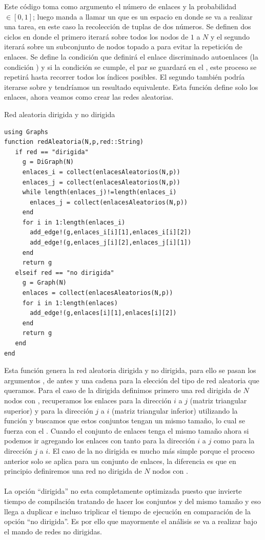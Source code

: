 Este código toma como argumento el número de enlaces  y la probabilidad $\in[0,1]$; luego manda a llamar un  que es un espacio en donde se va a realizar una tarea, en este caso la recolección de tuplas de dos números. Se definen dos ciclos  en donde el primero iterará sobre todos los nodos de $1$ a $N$ y el segundo iterará sobre un subconjunto de nodos topado a  para evitar la repetición de enlaces. Se define la condición  que definirá el enlace discriminado autoenlaces (la condición ) y si la condición se cumple, el par  se guardará en el , este proceso se repetirá hasta recorrer todos los índices posibles. El segundo  también podría iterarse sobre  y tendríamos un resultado equivalente. Esta función define solo los enlaces, ahora veamos como crear las redes aleatorias.
\begin{algorithm}
	\caption{Red aleatoria dirigida y no dirigida}
	\label{al:redAleatoria}
	\begin{verbatim}
using Graphs
function redAleatoria(N,p,red::String)
   if red == "dirigida"
     g = DiGraph(N)
     enlaces_i = collect(enlacesAleatorios(N,p))
     enlaces_j = collect(enlacesAleatorios(N,p))
     while length(enlaces_j)!=length(enlaces_i)
       enlaces_j = collect(enlacesAleatorios(N,p))
     end   
     for i in 1:length(enlaces_i)
       add_edge!(g,enlaces_i[i][1],enlaces_i[i][2])
       add_edge!(g,enlaces_j[i][2],enlaces_j[i][1])
     end
     return g
   elseif red == "no dirigida"
     g = Graph(N)
     enlaces = collect(enlacesAleatorios(N,p))
     for i in 1:length(enlaces)
       add_edge!(g,enlaces[i][1],enlaces[i][2])
     end
     return g
   end
end
	\end{verbatim}
\end{algorithm}

Esta función genera la red aleatoria dirigida y no dirigida, para ello se pasan los argumentos ,  de antes y una cadena  para la elección del tipo de red aleatoria que queramos. Para el caso de la dirigida definimos primero una red dirigida de $N$ nodos con , recuperamos los enlaces para la dirección $i$ a $j$ (matriz triangular superior) y para la dirección $j$ a $i$ (matriz triangular inferior) utilizando la función  y buscamos que estos conjuntos tengan un mismo tamaño, lo cual se fuerza con el . Cuando el conjunto de enlaces tenga el mismo tamaño ahora si podemos ir agregando los enlaces con  tanto para la dirección $i$ a $j$ como para la dirección $j$ a $i$. El caso de la no dirigida es mucho más simple porque el proceso anterior solo se aplica para un conjunto de enlaces, la diferencia es que en principio definiremos una red no dirigida de $N$ nodos con .\\
\\
La opción ``dirigida'' no esta completamente optimizada puesto que invierte tiempo de compilación tratando de hacer los conjuntos  y  del mismo tamaño y eso llega a duplicar e incluso triplicar el tiempo de ejecución en comparación de la opción ``no dirigida''. Es por ello que mayormente el análisis se va a realizar bajo el mando de redes no dirigidas.

